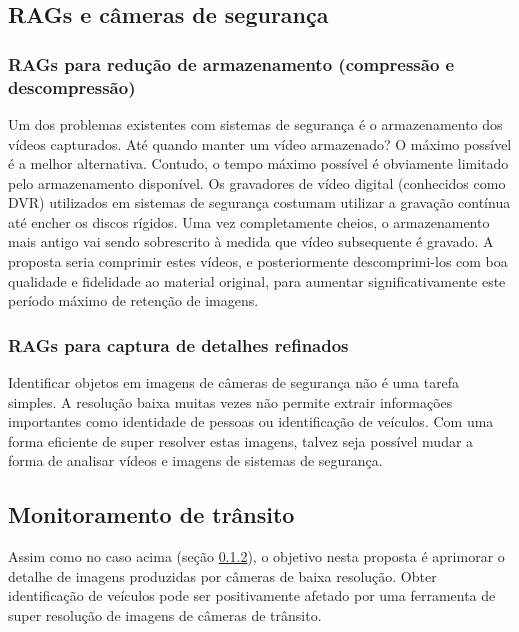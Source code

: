 \subsection{RAGs e câmeras de segurança}
\label{sec:trabalhos-futuros:monitoramento:camera-seguranca}

\subsubsection{RAGs para redução de armazenamento (compressão e descompressão)}
\label{sec:trabalhos-futuros:monitoramento:camera-seguranca:compressao-descompressao}

Um dos problemas existentes com sistemas de segurança é o armazenamento dos vídeos capturados. Até quando manter um vídeo armazenado? O máximo possível é a melhor alternativa. Contudo, o tempo máximo possível é obviamente limitado pelo armazenamento disponível. Os gravadores de vídeo digital (conhecidos como DVR) utilizados em sistemas de segurança costumam utilizar a gravação contínua até encher os discos rígidos. Uma vez completamente cheios, o armazenamento mais antigo vai sendo sobrescrito à medida que vídeo subsequente é gravado. A proposta seria comprimir estes vídeos, e posteriormente descomprimi-los com boa qualidade e fidelidade ao material original, para aumentar significativamente este período máximo de retenção de imagens. 

\subsubsection{RAGs para captura de detalhes refinados}
\label{sec:trabalhos-futuros:monitoramento:camera-seguranca:extracao-detalhes}

Identificar objetos em imagens de câmeras de segurança não é uma tarefa simples. A resolução baixa muitas vezes não permite extrair informações importantes como identidade de pessoas ou identificação de veículos. Com uma forma eficiente de super resolver estas imagens, talvez seja possível mudar a forma de analisar vídeos e imagens de sistemas de segurança. 

\subsection{Monitoramento de trânsito}
\label{sec:trabalhos-futuros:monitoramento:transito}

Assim como no caso acima (seção \ref{sec:trabalhos-futuros:monitoramento:camera-seguranca:extracao-detalhes}), o objetivo nesta proposta é aprimorar o detalhe de imagens produzidas por câmeras de baixa resolução. Obter identificação de veículos pode ser positivamente afetado por uma ferramenta de super resolução de imagens de câmeras de trânsito. 

